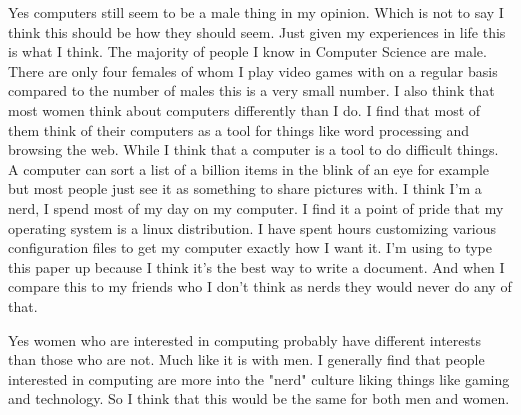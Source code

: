 \documentclass{article}
\begin{document}
Yes computers still seem to be a male thing in my opinion. Which is not to say I
think this should be how they should seem. Just given my experiences in life
this is what I think. The majority of people I know in Computer Science are
male. There are only four females of whom I play video games with on a regular
basis compared to the number of males this is a very small number. I also think
that most women think about computers differently than I do. I find that most of
them think of their computers as a tool for things like word processing and
browsing the web. While I think that a computer is a tool to do difficult
things. A computer can sort a list of a billion items in the blink of an eye for
example but most people just see it as something to share pictures with. I think
I'm a nerd, I spend most of my day on my computer. I find it a point of pride
that my operating system is a linux distribution. I have spent hours customizing
various configuration files to get my computer exactly how I want it. I'm using
\latex to type this paper up because I think it's the best way to write a
document. And when I compare this to my friends who I don't think as nerds they
would never do any of that.

Yes women who are interested in computing probably have different interests than
those who are not. Much like it is with men. I generally find that people
interested in computing are more into the "nerd" culture liking things like
gaming and technology. So I think that this would be the same for both men and
women.
\end{document}
